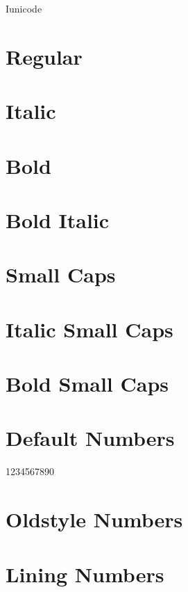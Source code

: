 \documentclass[a4paper]{article}
\begin{document}
\thispagestyle{empty}

\begin{center}\huge Iunicode
\end{center}


\section*{Regular}
\lipsum[1]

\section*{Italic}
\emph{\lipsum[2]}

\section*{Bold}
\textbf{\lipsum[1]}

\section*{Bold Italic}
\textbf{\emph{\lipsum[2]}}

\section*{Small Caps}
\textsc{\lipsum[1]}

\section*{Italic Small Caps}
\emph{\textsc{\lipsum[2]}}

\section*{Bold Small Caps}
\textsc{\textbf{\lipsum[1]}}

\section*{Default Numbers}

1234567890

\section*{Oldstyle Numbers}


\section*{Lining Numbers}
\end{document}
